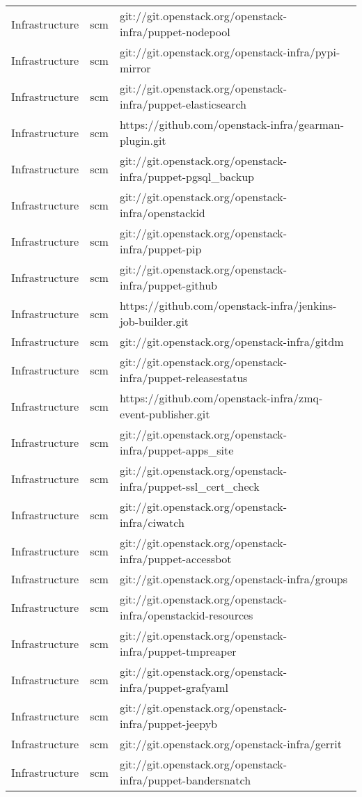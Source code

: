 \begin{center}
\begin{longtable}{|p{4cm}|p{1cm}|p{10cm}|}
Infrastructure&scm&git://git.openstack.org/openstack-infra/puppet-nodepool\\ 
Infrastructure&scm&git://git.openstack.org/openstack-infra/pypi-mirror\\ 
Infrastructure&scm&git://git.openstack.org/openstack-infra/puppet-elasticsearch\\ 
Infrastructure&scm&https://github.com/openstack-infra/gearman-plugin.git\\ 
Infrastructure&scm&git://git.openstack.org/openstack-infra/puppet-pgsql\_backup\\ 
Infrastructure&scm&git://git.openstack.org/openstack-infra/openstackid\\ 
Infrastructure&scm&git://git.openstack.org/openstack-infra/puppet-pip\\ 
Infrastructure&scm&git://git.openstack.org/openstack-infra/puppet-github\\ 
Infrastructure&scm&https://github.com/openstack-infra/jenkins-job-builder.git\\ 
Infrastructure&scm&git://git.openstack.org/openstack-infra/gitdm\\ 
Infrastructure&scm&git://git.openstack.org/openstack-infra/puppet-releasestatus\\ 
Infrastructure&scm&https://github.com/openstack-infra/zmq-event-publisher.git\\ 
Infrastructure&scm&git://git.openstack.org/openstack-infra/puppet-apps\_site\\ 
Infrastructure&scm&git://git.openstack.org/openstack-infra/puppet-ssl\_cert\_check\\ 
Infrastructure&scm&git://git.openstack.org/openstack-infra/ciwatch\\ 
Infrastructure&scm&git://git.openstack.org/openstack-infra/puppet-accessbot\\ 
Infrastructure&scm&git://git.openstack.org/openstack-infra/groups\\ 
Infrastructure&scm&git://git.openstack.org/openstack-infra/openstackid-resources\\ 
Infrastructure&scm&git://git.openstack.org/openstack-infra/puppet-tmpreaper\\ 
Infrastructure&scm&git://git.openstack.org/openstack-infra/puppet-grafyaml\\ 
Infrastructure&scm&git://git.openstack.org/openstack-infra/puppet-jeepyb\\ 
Infrastructure&scm&git://git.openstack.org/openstack-infra/gerrit\\ 
Infrastructure&scm&git://git.openstack.org/openstack-infra/puppet-bandersnatch\\ 

\end{longtable}
\end{center}
